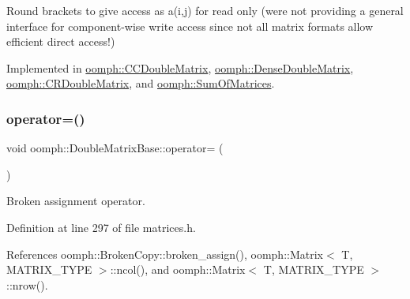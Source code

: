 Round brackets to give access as a(i,j) for read only (we\textquotesingle{}re not providing a general interface for component-\/wise write access since not all matrix formats allow efficient direct access!) 



Implemented in \hyperlink{classoomph_1_1CCDoubleMatrix_a2fd1f3dfa66ed45be1ced60d2835634c}{oomph\+::\+C\+C\+Double\+Matrix}, \hyperlink{classoomph_1_1DenseDoubleMatrix_ae41c14d2d7e4b5b568a9b371e7e53fbd}{oomph\+::\+Dense\+Double\+Matrix}, \hyperlink{classoomph_1_1CRDoubleMatrix_af5b1d934bae618c92aa1089671b6130e}{oomph\+::\+C\+R\+Double\+Matrix}, and \hyperlink{classoomph_1_1SumOfMatrices_a934664ec676d36115ef27a9758827f7c}{oomph\+::\+Sum\+Of\+Matrices}.

\mbox{\label{classoomph_1_1DoubleMatrixBase_a107b48a28db1ab8696e794e3d398a02e}} 
\subsubsection{\texorpdfstring{operator=()}{operator=()}}
{\footnotesize\ttfamily void oomph\+::\+Double\+Matrix\+Base\+::operator= (\begin{DoxyParamCaption}\item[{const \hyperlink{classoomph_1_1DoubleMatrixBase}{Double\+Matrix\+Base} \&}]{ }\end{DoxyParamCaption})\hspace{0.3cm}{\ttfamily [inline]}}



Broken assignment operator. 



Definition at line 297 of file matrices.\+h.



References oomph\+::\+Broken\+Copy\+::broken\+\_\+assign(), oomph\+::\+Matrix$<$ T, M\+A\+T\+R\+I\+X\+\_\+\+T\+Y\+P\+E $>$\+::ncol(), and oomph\+::\+Matrix$<$ T, M\+A\+T\+R\+I\+X\+\_\+\+T\+Y\+P\+E $>$\+::nrow().

\mbox{\label{classoomph_1_1DoubleMatrixBase_a971bdc2d9297fc582af8467178f4e00e}} 
